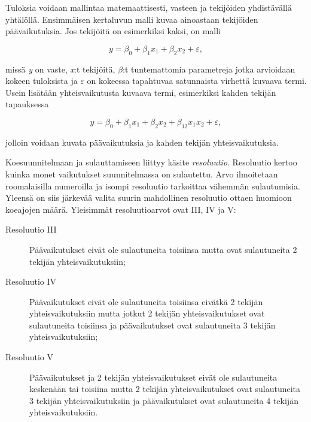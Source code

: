 \documentclass[12pt,a4paper,finnish]{tutthesis}
\begin{document}
Tuloksia voidaan mallintaa matemaattisesti, vasteen ja tekijöiden yhdistävällä
yhtälöllä. Ensimmäisen kertaluvun malli kuvaa ainoastaan tekijöiden päävaikutuksia.
Jos tekijöitä on esimerkiksi kaksi, on malli

\begin{equation}
  \label{eq:1krtluku}
 y = \beta _0 + \beta _{1}x_1 + \beta _{2}x_2 + \varepsilon,
\end{equation}

missä \textit{y} on vaste, \textit{x}:t tekijöitä, $\beta $:t tuntemattomia parametreja
jotka arvioidaan kokeen tuloksista ja $\varepsilon $ on
kokeessa tapahtuvaa satunnaista virhettä kuvaava termi.
Usein lisätään yhteisvaikutusta kuvaava termi, esimerkiksi kahden tekijän tapauksessa

\begin{equation}
  \label{eq:2krtluku}
 y = \beta _0 + \beta _{1}x_1 + \beta _{2}x_2 + \beta _{12}x_{1}x_{2} + \varepsilon,
\end{equation}

jolloin voidaan kuvata päävaikutuksia ja kahden tekijän yhteisvaikutuksia.



Koesuunnitelmaan ja sulauttamiseen liittyy käsite \textit{resoluutio}. Resoluutio
kertoo kuinka monet vaikutukset suunnitelmassa on sulautettu. Arvo ilmoitetaan
roomalaisilla numeroilla ja isompi resoluutio tarkoittaa vähemmän sulautumisia.
Yleensä on siis järkevää valita suurin mahdollinen resoluutio ottaen huomioon
koeajojen määrä. Yleisimmät resoluutioarvot ovat III, IV ja V:

\begin{description}
\item[Resoluutio III] Päävaikutukset eivät ole sulautuneita toisiinsa
mutta ovat sulautuneita 2 tekijän yhteisvaikutuksiin;
\item[Resoluutio IV] Päävaikutukset eivät ole sulautuneita toisiinsa eivätkä 2 tekijän
yhteisvaikutuksiin mutta jotkut 2 tekijän yhteisvaikutukset ovat sulautuneita toisiinsa
ja päävaikutukset ovat sulautuneita 3 tekijän yhteisvaikutuksiin;
\item[Resoluutio V] Päävaikutukset ja 2 tekijän yhteisvaikutukset eivät ole sulautuneita
keskenään tai toisiina mutta 2 tekijän yhteisvaikutukset ovat sulautuneita 3 tekijän
yhteisvaikutuksiin ja päävaikutukset ovat sulautuneita 4 tekijän yhteisvaikutuksiin. \parencite[s.~9]{montgomery2006}
\end{description}
\end{document}
